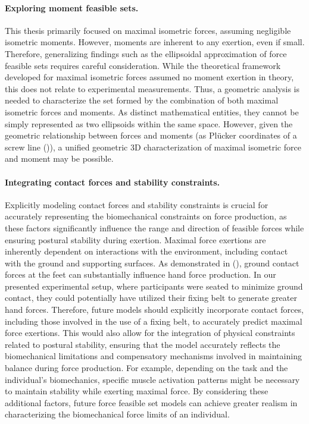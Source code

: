 \paragraph*{Exploring moment feasible sets.} This thesis primarily focused on maximal isometric forces, assuming negligible isometric moments. However, moments are inherent to any exertion, even if small. Therefore, generalizing findings such as the ellipsoidal approximation of force feasible sets requires careful consideration. While the theoretical framework developed for maximal isometric forces assumed no moment exertion in theory, this does not relate to experimental measurements. Thus, a geometric analysis is needed to characterize the set formed by the combination of both maximal isometric forces and moments. As distinct mathematical entities, they cannot be simply represented as two ellipsoids within the same space. However, given the geometric relationship between forces and moments (as Plücker coordinates of a screw line (\cite{dorstGeometricAlgebraComputer2007})), a unified geometric 3D characterization of maximal isometric force and moment may be possible.

\paragraph*{Integrating contact forces and stability constraints.}  Explicitly modeling contact forces and stability constraints is crucial for accurately representing the biomechanical constraints on force production, as these factors significantly influence the range and direction of feasible forces while ensuring postural stability during exertion. Maximal force exertions are inherently dependent on interactions with the environment, including contact with the ground and supporting surfaces. As demonstrated in (\cite{leeBiomechanicalAnalysisCoordinated2023}), ground contact forces at the feet can substantially influence hand force production. In our presented experimental setup, where participants were seated to minimize ground contact, they could potentially have utilized their fixing belt to generate greater hand forces. Therefore, future models should explicitly incorporate contact forces, including those involved in the use of a fixing belt, to accurately predict maximal force exertions. This would also allow for the integration of physical constraints related to postural stability, ensuring that the model accurately reflects the biomechanical limitations and compensatory mechanisms involved in maintaining balance during force production. For example, depending on the task and the individual's biomechanics, specific muscle activation patterns might be necessary to maintain stability while exerting maximal force. By considering these additional factors, future force feasible set models can achieve greater realism in characterizing the biomechanical force limits of an individual.

